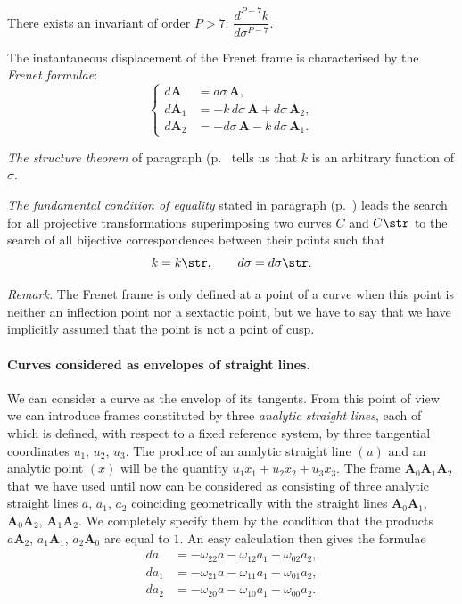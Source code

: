 There exists an invariant of order $P>7$: $\dfrac{d^{P-7}k}{d\sigma^{P-7}}$.

The instantaneous displacement of the Frenet frame is characterised by the \emph{Frenet formulae}:
\begin{equation}
  \label{eq:10.3.16}
  \left\{
    \begin{aligned}
      d\mathbf{A}_{\phantom{0}}&=d\sigma\,\mathbf{A},\\
      d\mathbf{A}_{1}&=-k\,d\sigma\,\mathbf{A}+d\sigma\,\mathbf{A}_{2},\\      
      d\mathbf{A}_{2}&=-d\sigma\,\mathbf{A}-k\,d\sigma\,\mathbf{A}_{1}.
    \end{aligned}
  \right.
\end{equation}

\emph{The structure theorem} of paragraph  (p.~\pageref{sec:77} tells us that $k$ is an arbitrary function of $\sigma$.

\emph{The fundamental condition of equality} stated in paragraph  (p.~\pageref{sec:76}) leads the search for all projective transformations superimposing two curves $C$ and $C\str$ to the search of all bijective correspondences between their points such that
\[
k=k\str,\qquad d\sigma=d\sigma\str.
\]

\emph{Remark.} The Frenet frame is only defined at a point of a curve when this point is neither an inflection point nor a sextactic point, but we have to say that we have implicitly assumed that the point is not a point of cusp.

\paragraph{Curves considered as envelopes of straight lines.}
\label{sec:150}
We can consider a curve as the envelop of its tangents. From this point of view we can introduce frames constituted by three \emph{analytic straight lines}, each of which is defined, with respect to a fixed reference system, by three tangential coordinates $u_{1}$, $u_{2}$, $u_{3}$. The produce of an analytic straight line $(u)$ and an analytic point $(x)$ will be the quantity $u_{1}x_{1}+u_{2}x_{2}+u_{3}x_{3}$. The frame $\mathbf{A}_{0}\mathbf{A}_{1}\mathbf{A}_{2}$ that we have used until now can be considered as consisting of three analytic straight lines $a$, $a_{1}$, $a_{2}$ coinciding geometrically with the straight lines $\mathbf{A}_{0}\mathbf{A}_{1}$, $\mathbf{A}_{0}\mathbf{A}_{2}$, $\mathbf{A}_{1}\mathbf{A}_{2}$. We completely specify them by the condition that the products $a\mathbf{A}_{2}$, $a_{1}\mathbf{A}_{1}$, $a_{2}\mathbf{A}_{0}$ are equal to $1$. An easy calculation then gives the formulae
\begin{align*}
  da_{\phantom{0}}&=-\omega_{22}a-\omega_{12}a_{1}-\omega_{02}a_{2},\\
  da_{{1}}&=-\omega_{21}a-\omega_{11}a_{1}-\omega_{01}a_{2},\\
  da_{{2}}&=-\omega_{20}a-\omega_{10}a_{1}-\omega_{00}a_{2}.
\end{align*}

